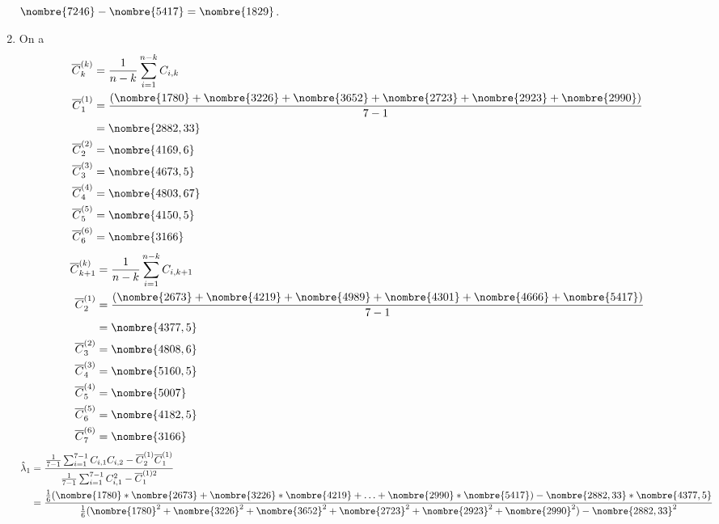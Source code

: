 \begin{exercice}
\begin{sol}
\begin{enumerate}
      $\nombre{7246} - \nombre{5417} = \nombre{1829}$.
    \item On a
      \begin{align*}
        \overline{C}_k^{(k)} &= \frac{1}{n - k}\sum_{i=1}^{n-k}C_{i,k}\\
        \overline{C}_1^{(1)} &=
                               \frac{(\nombre{1780}+\nombre{3226}+\nombre{3652}+\nombre{2723}+\nombre{2923}+\nombre{2990})}{7-1}\\
                             &= \nombre{2882,33} \\
        \overline{C}_2^{(2)} &= \nombre{4169,6} \\
        \overline{C}_3^{(3)} &= \nombre{4673,5} \\
        \overline{C}_4^{(4)} &= \nombre{4803,67} \\
        \overline{C}_5^{(5)} &= \nombre{4150,5} \\
        \overline{C}_6^{(6)} &= \nombre{3166}
      \end{align*}
      \begin{align*}
        \overline{C}_{k+1}^{(k)} &= \frac{1}{n-k} \sum_{i=1}^{n-k}
                                   C_{i,k+1}\\
        \overline{C}_2^{(1)} &=
                               \frac{(\nombre{2673}+\nombre{4219}+\nombre{4989}+\nombre{4301}+\nombre{4666}+\nombre{5417})}{7-1}\\
                                 &= \nombre{4377,5} \\
        \overline{C}_3^{(2)} &= \nombre{4808,6} \\
        \overline{C}_4^{(3)} &= \nombre{5160,5} \\
        \overline{C}_5^{(4)} &= \nombre{5007} \\
        \overline{C}_6^{(5)} &= \nombre{4182,5} \\
        \overline{C}_7^{(6)} &= \nombre{3166}
      \end{align*}
      \begin{align*}
        \hat{\lambda}_1 &= \frac{\frac{1}{7-1} \sum_{i=1}^{7-1} C_{i,1} C_{i,2} - \overline{C}_{2}^{(1)} \overline{C}_{1}^{(1)}}
                          {\frac{1}{7-1} \sum_{i=1}^{7-1}  C_{i,1}^2 - \overline{C}_{1}^{(1)2} }   \\
                        &=   \frac{\frac{1}{6}(\nombre{1780}*\nombre{2673} +
                          \nombre{3226}*\nombre{4219} + \ldots + \nombre{2990}*\nombre{5417})  - \nombre{2882,33}*\nombre{4377,5}}
                          {\frac{1}{6} (\nombre{1780}^2+ \nombre{3226}^2 + \nombre{3652}^2 + \nombre{2723}^2+ \nombre{2923}^2+ \nombre{2990}^2) - \nombre{2882,33}^2}\\

\end{align*}
\end{enumerate}
\end{sol}
\end{exercice}
